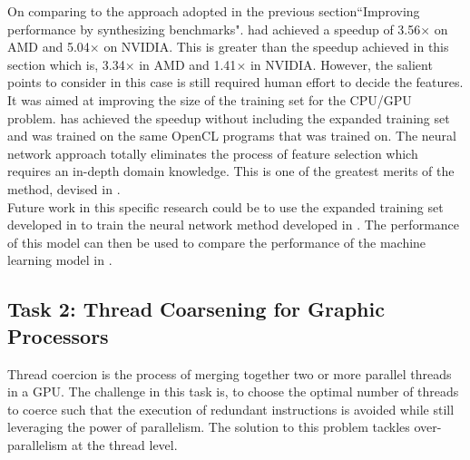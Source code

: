 \documentclass[a4paper,11pt]{article}
\begin{document}
   \indent On comparing to the approach adopted in the previous section``Improving performance by synthesizing benchmarks". \cite{sixth} had achieved a speedup of 3.56$\times$ on AMD and 5.04$\times$  on NVIDIA. This is greater than the speedup achieved in this section which is, 3.34$\times$ in AMD and 1.41$\times$ in NVIDIA. However, the salient points to consider in this case is \cite{sixth} still required human effort to decide the features. It was aimed at improving the size of the training set for the CPU/GPU problem. \cite{first} has achieved the speedup without including the expanded training set and was trained on the same OpenCL programs that \cite{second} was trained on. The neural network approach totally eliminates the process of feature selection which requires an in-depth domain knowledge. This is one of the greatest merits of the method, devised in \cite{first}.\\
   \indent Future work in this specific research could be to use the expanded training set developed in \cite{sixth} to train the neural network method developed in \cite{first}. The performance of this model can then be used to compare the performance of the machine learning model in \cite{second}.
   \subsection{Task 2: Thread Coarsening for Graphic Processors}    
      \indent\indent Thread coercion is the process of merging together two or more parallel threads in a GPU. The challenge in this task is, to choose the optimal number of threads to coerce such that the execution of redundant instructions is avoided while still leveraging the power of parallelism. The solution to this problem tackles over-parallelism at the thread level.
\end{document}
